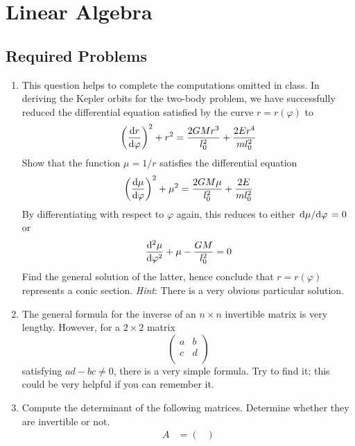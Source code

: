\documentclass[../psets.tex]{subfiles}
\begin{document}
\section{Linear Algebra}
\subsection*{Required Problems}
\begin{enumerate}
    \item {}This question helps to complete the computations omitted in class. In deriving the Kepler orbits for the two-body problem, we have successfully reduced the differential equation satisfied by the curve $r=r(\varphi)$ to
    \begin{equation*}
        \left( \dv{r}{\varphi} \right)^2+r^2 = \frac{2GMr^3}{l_0^2}+\frac{2Er^4}{ml_0^2}
    \end{equation*}
    Show that the function $\mu=1/r$ satisfies the differential equation
    \begin{equation*}
        \left( \dv{\mu}{\varphi} \right)^2+\mu^2 = \frac{2GM\mu}{l_0^2}+\frac{2E}{ml_0^2}
    \end{equation*}
    By differentiating with respect to $\varphi$ again, this reduces to either $\dv*{\mu}{\varphi}=0$ or
    \begin{equation*}
        \dv[2]{\mu}{\varphi}+\mu-\frac{GM}{l_0^2} = 0
    \end{equation*}
    Find the general solution of the latter, hence conclude that $r=r(\varphi)$ represents a conic section. \emph{Hint}: There is a very obvious particular solution.
    \item The general formula for the inverse of an $n\times n$ invertible matrix is very lengthy. However, for a $2\times 2$ matrix
    \begin{equation*}
        \begin{pmatrix}
            a & b\\
            c & d\\
        \end{pmatrix}
    \end{equation*}
    satisfying $ad-bc\neq 0$, there is a very simple formula. Try to find it; this could be very helpful if you can remember it.
    \item Compute the determinant of the following matrices. Determine whether they are invertible or not.
    \begin{align*}
        A &=
        \begin{pmatrix}

\end{pmatrix}
\end{align*}
\end{enumerate}
\end{document}
